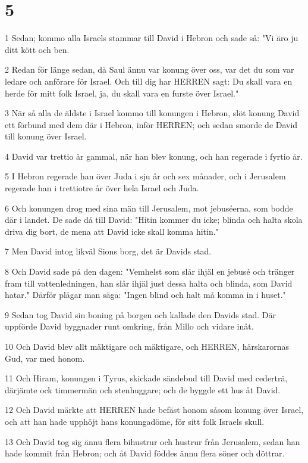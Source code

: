 \chapter{5}

\par 1 Sedan; kommo alla Israels stammar till David i Hebron och sade så: "Vi äro ju ditt kött och ben.
\par 2 Redan för länge sedan, då Saul ännu var konung över oss, var det du som var ledare och anförare för Israel. Och till dig har HERREN sagt: Du skall vara en herde för mitt folk Israel, ja, du skall vara en furste över Israel."
\par 3 När så alla de äldste i Israel kommo till konungen i Hebron, slöt konung David ett förbund med dem där i Hebron, inför HERREN; och sedan smorde de David till konung över Israel.
\par 4 David var trettio år gammal, när han blev konung, och han regerade i fyrtio år.
\par 5 I Hebron regerade han över Juda i sju år och sex månader, och i Jerusalem regerade han i trettiotre år över hela Israel och Juda.
\par 6 Och konungen drog med sina män till Jerusalem, mot jebuséerna, som bodde där i landet. De sade då till David: "Hitin kommer du icke; blinda och halta skola driva dig bort, de mena att David icke skall komma hitin."
\par 7 Men David intog likväl Sions borg, det är Davids stad.
\par 8 Och David sade på den dagen: "Vemhelst som slår ihjäl en jebusé och tränger fram till vattenledningen, han slår ihjäl just dessa halta och blinda, som David hatar." Därför plägar man säga: "Ingen blind och halt må komma in i huset."
\par 9 Sedan tog David sin boning på borgen och kallade den Davids stad. Där uppförde David byggnader runt omkring, från Millo och vidare inåt.
\par 10 Och David blev allt mäktigare och mäktigare, och HERREN, härskarornas Gud, var med honom.
\par 11 Och Hiram, konungen i Tyrus, skickade sändebud till David med cederträ, därjämte ock timmermän och stenhuggare; och de byggde ett hus åt David.
\par 12 Och David märkte att HERREN hade befäst honom såsom konung över Israel, och att han hade upphöjt hans konungadöme, för sitt folk Israels skull.
\par 13 Och David tog sig ännu flera bihustrur och hustrur från Jerusalem, sedan han hade kommit från Hebron; och åt David föddes ännu flera söner och döttrar.
